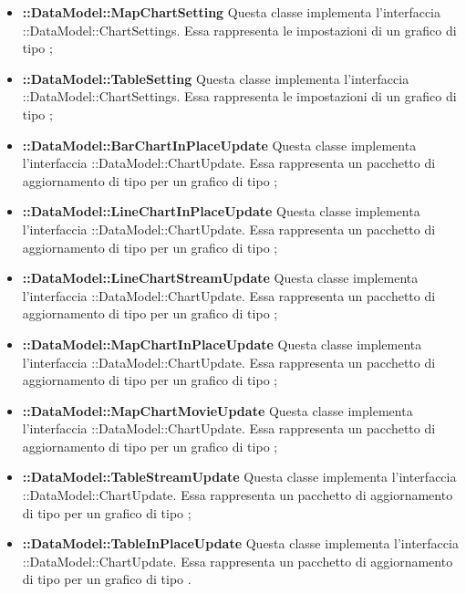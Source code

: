 \begin{itemize}
		\item \textbf{::DataModel::MapChartSetting} Questa classe implementa l'interfaccia \linebreak {}::DataModel::ChartSettings. Essa rappresenta le impostazioni di un grafico di tipo ;

		\item \textbf{::DataModel::TableSetting} Questa classe implementa l'interfaccia \linebreak {}::DataModel::ChartSettings. Essa rappresenta le impostazioni di un grafico di tipo ;

		\item \textbf{::DataModel::BarChartInPlaceUpdate} Questa classe implementa l'interfaccia ::DataModel::ChartUpdate. Essa rappresenta un pacchetto di aggiornamento di tipo  per un grafico di tipo ;

		\item \textbf{::DataModel::LineChartInPlaceUpdate} Questa classe implementa l'interfaccia ::DataModel::ChartUpdate. Essa rappresenta un pacchetto di aggiornamento di tipo  per un grafico di tipo ;

		\item \textbf{::DataModel::LineChartStreamUpdate} Questa classe implementa l'interfaccia ::DataModel::ChartUpdate. Essa rappresenta un pacchetto di aggiornamento di tipo  per un grafico di tipo ;

		\item \textbf{::DataModel::MapChartInPlaceUpdate} Questa classe implementa l'interfaccia ::DataModel::ChartUpdate. Essa rappresenta un pacchetto di aggiornamento di tipo  per un grafico di tipo ;

		\item \textbf{::DataModel::MapChartMovieUpdate} Questa classe implementa l'interfaccia ::DataModel::ChartUpdate. Essa rappresenta un pacchetto di aggiornamento di tipo  per un grafico di tipo ;

		\item \textbf{::DataModel::TableStreamUpdate} Questa classe implementa l'interfaccia ::DataModel::ChartUpdate. Essa rappresenta un pacchetto di aggiornamento di tipo  per un grafico di tipo ;

		\item \textbf{::DataModel::TableInPlaceUpdate} Questa classe implementa l'interfaccia ::DataModel::ChartUpdate. Essa rappresenta un pacchetto di aggiornamento di tipo  per un grafico di tipo .
	\end{itemize}
